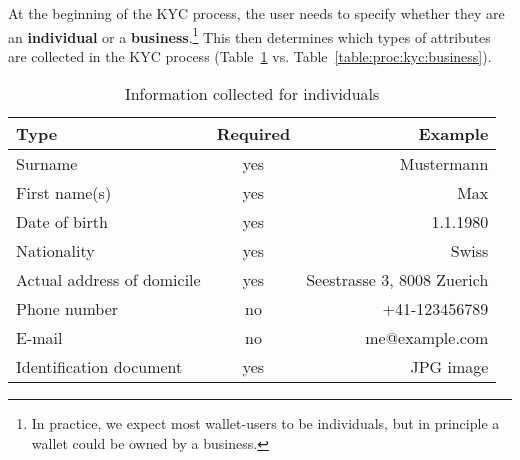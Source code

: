 At the beginning of the KYC process, the user needs to specify whether they
are an {\bf individual} or a {\bf business}.\footnote{ In practice, we expect
most wallet-users to be individuals, but in principle a wallet could be owned
by a business.}  This then determines which types of attributes are collected
in the KYC process (Table~\ref{table:proc:kyc:individual} vs.
Table~\ref{table:proc:kyc:business}).

\begin{table}
  \caption{Information collected for individuals}
  \label{table:proc:kyc:individual}
  \begin{center}
    \begin{tabular}{l|c|r}
      {\bf Type}                 & {\bf Required}    & {\bf Example} \\ \hline \hline
      Surname                    & yes        & Mustermann \\
      First name(s)              & yes        & Max \\
      Date of birth              & yes        & 1.1.1980 \\
      Nationality                & yes        & Swiss \\
      Actual address of domicile & yes        & Seestrasse 3, 8008 Zuerich \\
      Phone number               & no         & +41-123456789 \\
      E-mail                     & no         & me@example.com \\
      Identification document    & yes        & JPG image \\
  \end{tabular}
  \end{center}
\end{table}

